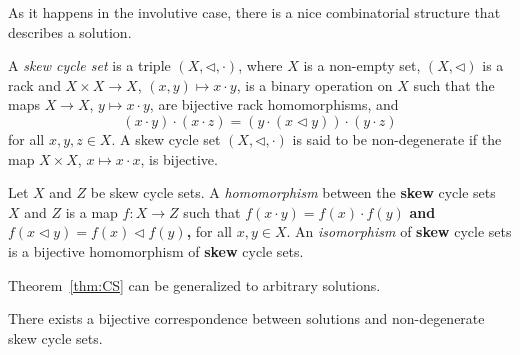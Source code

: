As it happens in the involutive case, there is a nice combinatorial structure that describes  
a solution. 

\begin{definition}
\label{defn:skewCS}
A \emph{skew cycle set} is a triple $(X,\triangleleft,\cdot)$, where $X$ is a non-empty set, 
$(X,\triangleleft)$ is a rack and
$X\times X\to X$, $(x,y)\mapsto x\cdot y$, is a binary operation on $X$ such that the maps 
$X\to X$, $y\mapsto x\cdot y$, are bijective rack homomorphisms, and 
\begin{equation}
\label{eq:skew_CS}
(x\cdot y)\cdot (x\cdot z)=(y\cdot (x\triangleleft y))\cdot (y\cdot z)
\end{equation}
for all $x,y,z\in X$. A skew cycle set $(X,\triangleleft,\cdot)$ is said to be 
non-degenerate if the map $X\times X$, $x\mapsto x\cdot x$, is bijective.
\end{definition}


\begin{definition}
Let $X$ and $Z$ be skew cycle sets. 
A \emph{homomorphism} between the {\bf skew} cycle sets $X$ and $Z$ is a 
map $f\colon X\to Z$ such that $f(x\cdot y)=f(x)\cdot f(y)$ {\bf and $f(x\triangleleft y)=f(x)\triangleleft f(y)$,} for all $x,y\in X$. An \emph{isomorphism} of {\bf skew} cycle sets
is a bijective homomorphism of {\bf skew} cycle sets. 
\end{definition}



Theorem~\ref{thm:CS} can be generalized to arbitrary solutions.

\begin{theorem}
\label{thm:skewCS}
There exists a bijective correspondence between solutions 
and non-degenerate skew cycle sets. 
\end{theorem}


